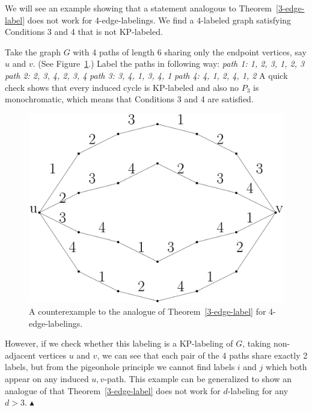 \documentclass[12pt,a4paper,titlepage,openany]{report}
\begin{document}
\begin{example}
We will see an example showing that a statement analogous to Theorem~\ref{3-edge-label} does not work for 4-edge-labelings. We find a $4$-labeled graph satisfying Conditions 3 and 4 that is not KP-labeled.

Take the graph $G$ with 4 paths of length 6 sharing only the endpoint vertices, say $u$ and $v$. (See Figure~\ref{counterexample}.) Label the paths in following way:\newline
\textit{path 1: 1, 2, 3, 1, 2, 3}\newline
\textit{path 2: 2, 3, 4, 2, 3, 4}\newline
\textit{path 3: 3, 4, 1, 3, 4, 1}\newline
\textit{path 4: 4, 1, 2, 4, 1, 2}\newline
A quick check shows that every induced cycle is KP-labeled and also no $P_3$ is monochromatic, which means that Conditions 3 and 4 are satisfied.

\begin{figure}[h]
\begin{center}
\includegraphics[width=0.7\linewidth]{figures/d4.png}
\end{center}
\caption{A counterexample to the analogue of Theorem~\ref{3-edge-label} for 4-edge-labelings.}\label{counterexample}
\end{figure}

However, if we check whether this labeling is a KP-labeling of $G$, taking non-adjacent vertices $u$ and $v$, we can see that each pair of the 4 paths share exactly 2 labels, but from the pigeonhole principle we cannot find labels $i$ and $j$ which both appear on any induced $u, v$-path.
This example can be generalized to show an analogue of that Theorem~\ref{3-edge-label} does not work for $d$-labeling for any $d>3$.
\hfill$\blacktriangle$
\end{example}
\end{document}
